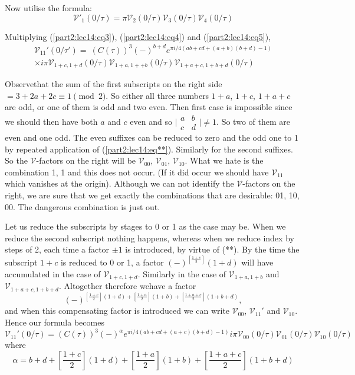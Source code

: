 Now utilise the formula:
$$
\mathscr{V}'_1 (0/\tau) = \pi \mathscr{V}_2 (0/ \tau)
\mathscr{V}_3(0/\tau) \mathscr{V}_4 (0/\tau)
$$

Multiplying (\ref{part2:lec14:eq3}), (\ref{part2:lec14:eq4}) and
(\ref{part2:lec14:eq5}), 
\begin{multline*}
  \mathscr{V}_{11}' (0/ \tau') =\ (C(\tau))^3 (-)^{b+d} e^{\pi i/4(ab+cd
    + (a+b)(b+d)-1)}\\ 
  \times i \pi \mathscr{V}_{1+c, 1+d} (0/ \tau)
  \mathscr{V}_{1+a, 1++b} (0/\tau) \mathscr{V}_{1+a+c,
    1+b+d} (0/\tau)
\end{multline*}

Observe\pageoriginale that the sum of the first subscripts on the
right side $=3+2a+2c\equiv 1 \pmod{2}$. So either all three numbers
$1+a$, $1+c$, $1+a+c$ are odd, or one of them is odd and two
even. Then first case is impossible since we should then have both $a$
and $c$ even and so $\big|\begin{smallmatrix} a & b \\ c&
  d \end{smallmatrix}\big|\neq 1$. So two of them are even and one
odd. The even suffixes can be reduced to zero and the odd one to 1 by
repeated application of (\ref{part2:lec14:eq**}). Similarly for the second suffixes. So
the $\mathscr{V}$-factors on the right will be $\mathscr{V}_{00}$,
$\mathscr{V}_{01}$, $\mathscr{V}_{10}$. What we hate is the
combination 1, 1 and this does not occur. (If it did occur we should
have $\mathscr{V}_{11}$ which vanishes at the origin). Although we can
not identify the $\mathscr{V}$-factors on the right, we are sure that
we get exactly the combinations that are desirable: 01, 10, 00. The
dangerous combination is just out.

Let us reduce the subscripts by stages to 0 or 1 as the case may
be. When we reduce the second subscript nothing happens, whereas when
we reduce index by steps of 2, each time a factor $\pm 1$ is
introduced, by virtue of (**). By the time the subscript $1+c$ is
reduced to 0 or 1, a factor $(-)^{\left[\frac{1+c}{2}\right]}(1+d)$
will have accumulated in the case of $\mathscr{V}_{1+c,
  1+d}$. Similarly in the case of $\mathscr{V}_{1+a, 1+b}$ and
$\mathscr{V}_{1+a+c, 1+b+d}$. Altogether therefore
we\pageoriginale have a factor
$$
(-)^{\left[\frac{1+c}{2}\right](1+d)+ \left[\frac{1+a}{2}\right](1+b)
+ \left[\frac{1+a+c}{2}\right](1+b+d)},
$$
and when this compensating factor is introduced we can write
$\mathscr{V}_{00}$, $\mathscr{V}_{11}'$ and $\mathscr{V}_{10}$. Hence
our formula becomes
\begin{equation*}
  \mathscr{V}_{11}' (0 /\tau) = (C(\tau))^3 (-)^\alpha e^{\pi i/4
    (ab+cd+(a+c)(b+d)-1)} i \pi \mathscr{V}_{00} (0 /\tau)
    \mathscr{V}_{01} (0 /\tau) \mathscr{V}_{10}(0/ \tau)
    \tag{6}\label{part2:lec14:eq6} 
\end{equation*}
where
$$
\alpha = b+d + \left[\frac{1+c}{2} \right] (1+d) +
\left[\frac{1+a}{2}\right](1+b)+ \left[\frac{1+a+c}{2}\right] (1+b+d)
$$


